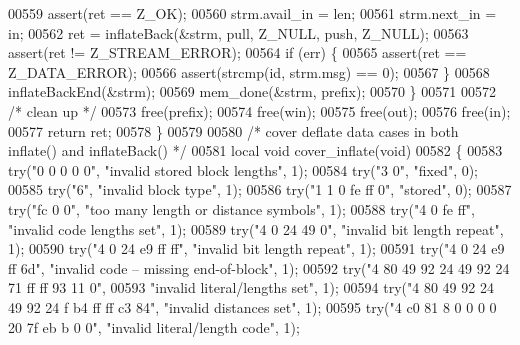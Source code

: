 \begin{DoxyCode}
{{{{{00559         assert(ret == Z\_OK);
00560         strm.avail\_in = len;
00561         strm.next\_in = in;
00562         ret = inflateBack(&strm, pull, Z\_NULL, push, Z\_NULL);
00563         assert(ret != Z\_STREAM\_ERROR);
00564         \textcolor{keywordflow}{if} (err) \{
00565             assert(ret == Z\_DATA\_ERROR);
00566             assert(strcmp(\textcolor{keywordtype}{id}, strm.msg) == 0);
00567         \}
00568         inflateBackEnd(&strm);
00569         mem\_done(&strm, prefix);
00570     \}
00571 
00572     \textcolor{comment}{/* clean up */}
00573     free(prefix);
00574     free(win);
00575     free(out);
00576     free(in);
00577     \textcolor{keywordflow}{return} ret;
00578 \}
00579 
00580 \textcolor{comment}{/* cover deflate data cases in both inflate() and inflateBack() */}
00581 local \textcolor{keywordtype}{void} cover\_inflate(\textcolor{keywordtype}{void})
00582 \{
00583     \textcolor{keywordflow}{try}(\textcolor{stringliteral}{"0 0 0 0 0"}, \textcolor{stringliteral}{"invalid stored block lengths"}, 1);
00584     \textcolor{keywordflow}{try}(\textcolor{stringliteral}{"3 0"}, \textcolor{stringliteral}{"fixed"}, 0);
00585     \textcolor{keywordflow}{try}(\textcolor{stringliteral}{"6"}, \textcolor{stringliteral}{"invalid block type"}, 1);
00586     \textcolor{keywordflow}{try}(\textcolor{stringliteral}{"1 1 0 fe ff 0"}, \textcolor{stringliteral}{"stored"}, 0);
00587     \textcolor{keywordflow}{try}(\textcolor{stringliteral}{"fc 0 0"}, \textcolor{stringliteral}{"too many length or distance symbols"}, 1);
00588     \textcolor{keywordflow}{try}(\textcolor{stringliteral}{"4 0 fe ff"}, \textcolor{stringliteral}{"invalid code lengths set"}, 1);
00589     \textcolor{keywordflow}{try}(\textcolor{stringliteral}{"4 0 24 49 0"}, \textcolor{stringliteral}{"invalid bit length repeat"}, 1);
00590     \textcolor{keywordflow}{try}(\textcolor{stringliteral}{"4 0 24 e9 ff ff"}, \textcolor{stringliteral}{"invalid bit length repeat"}, 1);
00591     \textcolor{keywordflow}{try}(\textcolor{stringliteral}{"4 0 24 e9 ff 6d"}, \textcolor{stringliteral}{"invalid code -- missing end-of-block"}, 1);
00592     \textcolor{keywordflow}{try}(\textcolor{stringliteral}{"4 80 49 92 24 49 92 24 71 ff ff 93 11 0"},
00593         \textcolor{stringliteral}{"invalid literal/lengths set"}, 1);
00594     \textcolor{keywordflow}{try}(\textcolor{stringliteral}{"4 80 49 92 24 49 92 24 f b4 ff ff c3 84"}, \textcolor{stringliteral}{"invalid distances set"}, 1);
00595     \textcolor{keywordflow}{try}(\textcolor{stringliteral}{"4 c0 81 8 0 0 0 0 20 7f eb b 0 0"}, \textcolor{stringliteral}{"invalid literal/length code"}, 1);
}}}}}
\end{DoxyCode}
